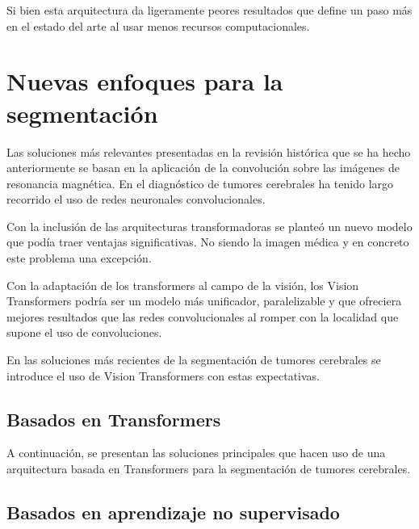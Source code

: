 		Si bien esta arquitectura da ligeramente peores resultados que \cite{myronenko20193d} define un paso más en el estado del arte al usar menos recursos computacionales.


\section{Nuevas enfoques para la segmentación}

	Las soluciones más relevantes presentadas en la revisión histórica que se ha hecho anteriormente se basan en la aplicación de la convolución sobre las imágenes de resonancia magnética. En el diagnóstico de tumores cerebrales ha tenido largo recorrido el uso de redes neuronales convolucionales. 
	
	Con la inclusión de las arquitecturas transformadoras se planteó un nuevo modelo que podía traer ventajas significativas. No siendo la imagen médica y en concreto este problema una excepción.
	
	Con la adaptación de los transformers al campo de la visión, los Vision Transformers podría ser un modelo más unificador, paralelizable y que ofreciera mejores resultados que las redes convolucionales al romper con la localidad que supone el uso de convoluciones. 
	
	En las soluciones más recientes de la segmentación de tumores cerebrales se introduce el uso de Vision Transformers con estas expectativas.
	
	\subsection{Basados en Transformers}
	
	A continuación, se presentan las soluciones principales que hacen uso de una arquitectura basada en Transformers para la segmentación de tumores cerebrales.
	
	\subsubsection{}
	
	\subsection{Basados en aprendizaje no supervisado}
